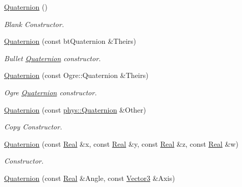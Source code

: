 \begin{DoxyCompactItemize}
\hyperlink{classphys_1_1Quaternion_aca4ee6fd6d3967f06cc4a32361fa5a62}{Quaternion} ()
\begin{DoxyCompactList}\small\item\em Blank Constructor. \item\end{DoxyCompactList}\item 
\hyperlink{classphys_1_1Quaternion_ab9f13d19fe7d602d7c5feaed0aaf4620}{Quaternion} (const btQuaternion \&Theirs)
\begin{DoxyCompactList}\small\item\em Bullet \hyperlink{classphys_1_1Quaternion}{Quaternion} constructor. \item\end{DoxyCompactList}\item 
\hyperlink{classphys_1_1Quaternion_a4902c05489ebae03a55433d947c53d03}{Quaternion} (const Ogre::Quaternion \&Theirs)
\begin{DoxyCompactList}\small\item\em Ogre \hyperlink{classphys_1_1Quaternion}{Quaternion} constructor. \item\end{DoxyCompactList}\item 
\hyperlink{classphys_1_1Quaternion_a46d08f43b0b638a256344b3919ba9e0d}{Quaternion} (const \hyperlink{classphys_1_1Quaternion}{phys::Quaternion} \&Other)
\begin{DoxyCompactList}\small\item\em Copy Constructor. \item\end{DoxyCompactList}\item 
\hyperlink{classphys_1_1Quaternion_ac8037875c08ce10c0195f3e6fd08b172}{Quaternion} (const \hyperlink{namespacephys_af7eb897198d265b8e868f45240230d5f}{Real} \&x, const \hyperlink{namespacephys_af7eb897198d265b8e868f45240230d5f}{Real} \&y, const \hyperlink{namespacephys_af7eb897198d265b8e868f45240230d5f}{Real} \&z, const \hyperlink{namespacephys_af7eb897198d265b8e868f45240230d5f}{Real} \&w)
\begin{DoxyCompactList}\small\item\em Constructor. \item\end{DoxyCompactList}\item 
\hyperlink{classphys_1_1Quaternion_a9246247b7b28f19839148415a7ddeb96}{Quaternion} (const \hyperlink{namespacephys_af7eb897198d265b8e868f45240230d5f}{Real} \&Angle, const \hyperlink{classphys_1_1Vector3}{Vector3} \&Axis)

\end{DoxyCompactItemize}
